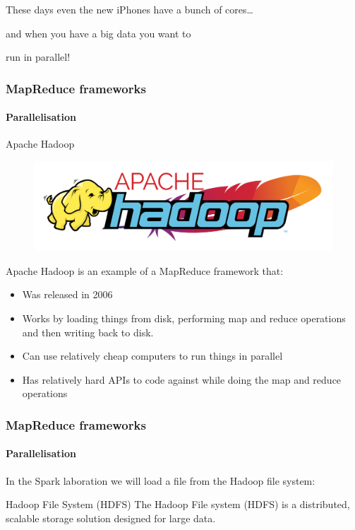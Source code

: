 \documentclass[aspectratio=169,dvipsnames]{beamer}
\begin{document}
{\begin{frame}[plain]
\begin{center}
            \Large These days even the new iPhones have a bunch of cores\ldots 
            
            \vspace{0.05\textheight}

            \normalsize and when you have a big data you want to\pause
            
            \vspace{0.1\textheight}
            
            \Huge run in parallel!
        \end{center}
    \end{frame}
}
       
    \begin{frame}
        \frametitle{MapReduce frameworks}
        \framesubtitle{Parallelisation}
        \begin{block}{Apache Hadoop}
        \begin{figure}
        \vspace{-1.2\baselineskip}
        \includegraphics[width=1\linewidth]{figures/hadoop.png}
        \end{figure}
        Apache Hadoop is an example of a MapReduce framework that:
        \begin{itemize}
            \item Was \alert{released in 2006}
            \item Works by loading things \alert{from disk}, performing map and reduce operations and then \alert{writing back to disk}.
            \item Can use relatively \alert{cheap computers} to run things in \alert{parallel}
            \item Has relatively \alert{hard APIs to code against} while doing the map and reduce operations
        \end{itemize}
        \end{block}
    \end{frame}

    \begin{frame}
        \frametitle{MapReduce frameworks}
        \framesubtitle{Parallelisation}
        \centering
        In the Spark laboration we will load a file from the Hadoop file system:
        \begin{block}{Hadoop File System (HDFS)}
            The Hadoop File system (HDFS) is a \alert{distributed},
            \alert{scalable} storage solution designed for large data.
        \end{block}
    \end{frame}
    
\end{document}
